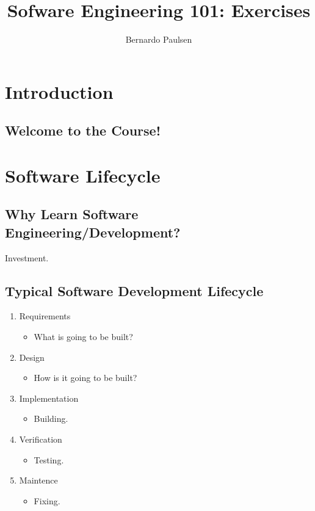 \documentclass{article}
\title{Sofware Engineering 101: Exercises}
\author{Bernardo Paulsen}
\begin{document}
    
\maketitle

\section{Introduction}

    \subsection{Welcome to the Course!}

\section{Software Lifecycle}

    \subsection{Why Learn Software Engineering/Development?}

        Investment.

    \subsection{Typical Software Development Lifecycle}

        \begin{enumerate}
            \item Requirements
                \begin{itemize}
                    \item What is going to be built?
                \end{itemize}
            \item Design
                \begin{itemize}
                    \item How is it going to be built?
                \end{itemize}
            \item Implementation
                \begin{itemize}
                    \item Building.
                \end{itemize}
            \item Verification
                \begin{itemize}
                    \item Testing.
                \end{itemize}
            \item Maintence
                \begin{itemize}
                    \item Fixing.
                \end{itemize}
        \end{enumerate}
\end{document}
